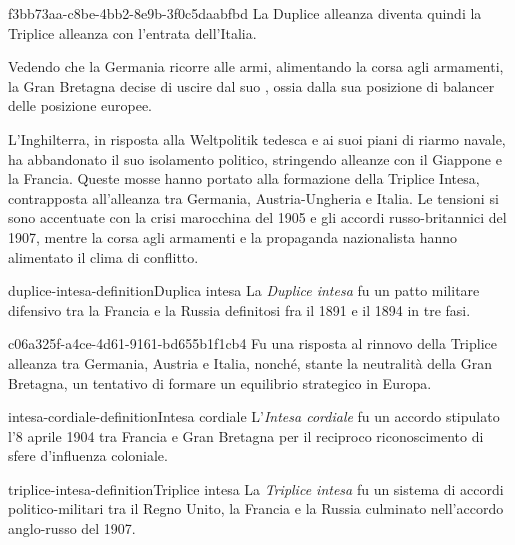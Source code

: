 \documentclass[preview]{standalone}
\begin{document}
\begin{snippet}{f3bb73aa-c8be-4bb2-8e9b-3f0c5daabfbd}
    La Duplice alleanza diventa quindi la Triplice alleanza 
    con l'entrata dell'Italia.
    
    
    Vedendo che la Germania ricorre alle armi, alimentando la corsa agli armamenti, la Gran Bretagna
    decise di uscire dal suo , ossia dalla sua posizione di balancer delle
    posizione europee.
    
    L'Inghilterra, in risposta alla Weltpolitik tedesca e ai suoi
    piani di riarmo navale, ha abbandonato il suo isolamento politico,
    stringendo alleanze con il Giappone e la Francia.
    Queste mosse hanno portato alla formazione della Triplice Intesa,
    contrapposta all'alleanza tra Germania,
    Austria-Ungheria e Italia.
    Le tensioni si sono accentuate con la crisi marocchina del 1905 e
    gli accordi russo-britannici del 1907, mentre la corsa agli armamenti e
    la propaganda nazionalista hanno alimentato il clima di conflitto.
\end{snippet}

\begin{snippetdefinition}{duplice-intesa-definition}{Duplica intesa}
    La \textit{Duplice intesa}
    fu un patto militare difensivo tra la Francia e la Russia definitosi fra il 1891 e il 1894 in tre fasi.
\end{snippetdefinition}

\begin{snippet}{c06a325f-a4ce-4d61-9161-bd655b1f1cb4}
    Fu una risposta al rinnovo della Triplice alleanza tra Germania,
    Austria e Italia, nonché, stante la neutralità della Gran Bretagna,
    un tentativo di formare un equilibrio strategico in Europa.
\end{snippet}

\begin{snippetdefinition}{intesa-cordiale-definition}{Intesa cordiale}
    L'\textit{Intesa cordiale}
    fu un accordo stipulato l'8 aprile 1904 tra Francia
    e Gran Bretagna per il reciproco riconoscimento di sfere d'influenza coloniale. 
\end{snippetdefinition}

\begin{snippetdefinition}{triplice-intesa-definition}{Triplice intesa}
    La \textit{Triplice intesa}
    fu un sistema di accordi politico-militari tra il Regno Unito,
    la Francia e la Russia culminato nell'accordo anglo-russo del 1907.
\end{snippetdefinition}
\end{document}
